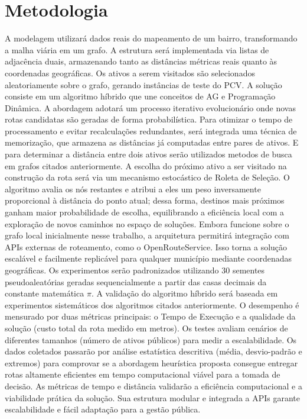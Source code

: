 \documentclass[conference,12pt]{IEEEtran}
\begin{document}
\section{Metodologia}
A modelagem utilizará dados reais do mapeamento de
um bairro, transformando a malha viária em um grafo. A estrutura
será implementada via listas de adjacência duais, armazenando tanto as distâncias
métricas reais quanto às coordenadas geográficas.
Os ativos a serem visitados são
selecionados aleatoriamente sobre o grafo, gerando instâncias de teste do PCV.
A solução consiste em um algoritmo híbrido que une conceitos de AG
e Programação Dinâmica.
A abordagem adotará um processo iterativo evolucionário
onde novas rotas candidatas são geradas de forma probabilística.
Para otimizar o tempo de processamento e evitar recalculações redundantes,
será integrada uma técnica de memorização, que
armazena as distâncias já computadas entre pares de ativos.
E para determinar a distância entre dois
ativos serão utilizados metodos de busca em grafos citados anteriormente.
A escolha do próximo ativo a ser visitado na construção da rota será
via um mecanismo estocástico de Roleta de Seleção. O algoritmo
avalia os nós restantes e atribui a eles um peso inversamente proporcional
à distância do ponto atual; dessa forma, destinos mais próximos ganham maior
probabilidade de escolha, equilibrando a eficiência local com a exploração de
novos caminhos no espaço de soluções.
Embora funcione sobre o grafo local inicialmente nesse trabalho, a arquitetura permitirá integração com
APIs externas de roteamento, como o OpenRouteService. Isso torna
a solução escalável e facilmente replicável para qualquer
município mediante coordenadas geográficas.
Os experimentos serão padronizados utilizando 30 sementes pseudoaleatórias
geradas sequencialmente a partir das casas decimais da constante matemática $\pi$.
A validação do algoritmo híbrido será baseada em experimentos sistemáticos
dos algoritmos citados anteriormente.
O desempenho é mensurado por duas métricas principais: o Tempo de Execução
e a qualidade da solução (custo total da rota medido em metros).
Os testes avaliam cenários de diferentes tamanhos (número de ativos públicos)
para medir a escalabilidade. Os dados coletados passarão por análise estatística
descritiva (média, desvio-padrão e extremos) para comprovar se a abordagem
heurística proposta consegue entregar rotas altamente eficientes em tempo
computacional viável para a tomada de decisão.
As métricas de tempo e distância validarão a eficiência computacional e a
viabilidade prática da solução. Sua estrutura modular e integrada a APIs
garante escalabilidade e fácil adaptação para a gestão pública.
\end{document}
